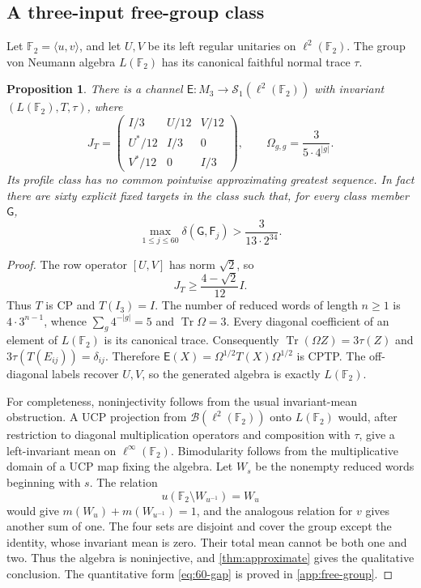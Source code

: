 \documentclass[11pt,reqno]{amsart}
\newtheorem{proposition}[theorem]{Proposition}
\theoremstyle{definition}
\theoremstyle{remark}
\numberwithin{equation}{section}
\DeclareMathOperator{\Tr}{Tr}
\newcommand{\Sone}{\mathcal S_1}
\newcommand{\B}{\mathcal B}
\newcommand{\E}{\mathsf E}
\newcommand{\F}{\mathsf F}
\newcommand{\G}{\mathsf G}
\newcommand{\defic}{\delta}
\begin{document}
\subsection{A three-input free-group class}

Let $\mathbb F_2=\langle u,v\rangle$, and let $U,V$ be its left regular unitaries on $\ell^2(\mathbb F_2)$. The group von Neumann algebra $L(\mathbb F_2)$ has its canonical faithful normal trace $\tau$.

\begin{proposition}\label{prop:free-group}
There is a channel $\E:M_3\to\Sone(\ell^2(\mathbb F_2))$ with invariant $(L(\mathbb F_2),T,\tau)$, where
\begin{equation}\label{eq:free-Choi}
 J_T=
 \begin{pmatrix}
 I/3&U/12&V/12\\
 U^*/12&I/3&0\\
 V^*/12&0&I/3
 \end{pmatrix},\qquad
 \Omega_{g,g}=\frac{3}{5\cdot4^{|g|}}.
\end{equation}
Its profile class has no common pointwise approximating greatest sequence. In fact there are sixty explicit fixed targets in the class such that, for every class member $\G$,
\begin{equation}\label{eq:60-gap}
 \max_{1\le j\le60}\defic(\G,\F_j)
 >\frac{3}{13\cdot2^{34}}.
\end{equation}
\end{proposition}

\begin{proof}
The row operator $[U,V]$ has norm $\sqrt2$, so
\[
 J_T\ge\frac{4-\sqrt2}{12}I.
\]
Thus $T$ is CP and $T(I_3)=I$. The number of reduced words of length $n\ge1$ is $4\cdot3^{n-1}$, whence $\sum_g4^{-|g|}=5$ and $\Tr\Omega=3$. Every diagonal coefficient of an element of $L(\mathbb F_2)$ is its canonical trace. Consequently $\Tr(\Omega Z)=3\tau(Z)$ and $3\tau(T(E_{ij}))=\delta_{ij}$. Therefore $\E(X)=\Omega^{1/2}T(X)\Omega^{1/2}$ is CPTP. The off-diagonal labels recover $U,V$, so the generated algebra is exactly $L(\mathbb F_2)$.

For completeness, noninjectivity follows from the usual invariant-mean obstruction. A UCP projection from $\B(\ell^2(\mathbb F_2))$ onto $L(\mathbb F_2)$ would, after restriction to diagonal multiplication operators and composition with $\tau$, give a left-invariant mean on $\ell^\infty(\mathbb F_2)$. Bimodularity follows from the multiplicative domain of a UCP map fixing the algebra. Let $W_s$ be the nonempty reduced words beginning with $s$. The relation
\[
 u(\mathbb F_2\setminus W_{u^{-1}})=W_u
\]
would give $m(W_u)+m(W_{u^{-1}})=1$, and the analogous relation for $v$ gives another sum of one. The four sets are disjoint and cover the group except the identity, whose invariant mean is zero. Their total mean cannot be both one and two. Thus the algebra is noninjective, and \cref{thm:approximate} gives the qualitative conclusion. The quantitative form \eqref{eq:60-gap} is proved in \cref{app:free-group}.
\end{proof}
\end{document}
